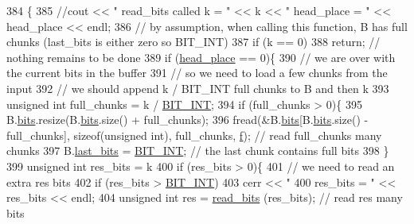 \begin{DoxyCode}
384                                                    \{
385   \textcolor{comment}{//cout << " read\_bits called k = " << k << " head\_place = " << head\_place << endl;}
386   \textcolor{comment}{// by assumption, when calling this function, B has full chunks (last\_bits is either zero so BIT\_INT)}
387   \textcolor{keywordflow}{if} (k == 0)
388     \textcolor{keywordflow}{return}; \textcolor{comment}{// nothing remains to be done}
389   \textcolor{keywordflow}{if} (\hyperlink{classibitstream_a7b96359ac1534a5565e6e9b0cc53a0b3}{head\_place} == 0)\{
390     \textcolor{comment}{// we are over with the current bits in the buffer}
391     \textcolor{comment}{// so we need to load a few chunks from the input}
392     \textcolor{comment}{// we should append k / BIT\_INT full chunks to B and then k %
393     \textcolor{keywordtype}{unsigned} \textcolor{keywordtype}{int} full\_chunks = k / \hyperlink{bitstream_8h_afcadf5aa65c5159bfb96c4d82ebc0a5d}{BIT\_INT};
394     \textcolor{keywordflow}{if} (full\_chunks > 0)\{
395       B.\hyperlink{classbit__pipe_a86f38af1e9736b053728033490476b50}{bits}.resize(B.\hyperlink{classbit__pipe_a86f38af1e9736b053728033490476b50}{bits}.size() + full\_chunks);
396       fread(&B.\hyperlink{classbit__pipe_a86f38af1e9736b053728033490476b50}{bits}[B.\hyperlink{classbit__pipe_a86f38af1e9736b053728033490476b50}{bits}.size() - full\_chunks], \textcolor{keyword}{sizeof}(\textcolor{keywordtype}{unsigned} int), full\_chunks, 
      \hyperlink{classibitstream_a3ea2cdd0cf97820f0e1520c42e364308}{f}); \textcolor{comment}{// read full\_chunks many chunks}
397       B.\hyperlink{classbit__pipe_a0f3e84b02751803adaab499b5dad86fe}{last\_bits} = \hyperlink{bitstream_8h_afcadf5aa65c5159bfb96c4d82ebc0a5d}{BIT\_INT}; \textcolor{comment}{// the last chunk contains full bits }
398     \}
399     \textcolor{keywordtype}{unsigned} \textcolor{keywordtype}{int} res\_bits = k %
400     \textcolor{keywordflow}{if} (res\_bits > 0)\{
401       \textcolor{comment}{// we need to read an extra res bits}
402       \textcolor{keywordflow}{if} (res\_bits > \hyperlink{bitstream_8h_afcadf5aa65c5159bfb96c4d82ebc0a5d}{BIT\_INT})
403         cerr << \textcolor{stringliteral}{" 400 res\_bits = "} << res\_bits << endl;
404       \textcolor{keywordtype}{unsigned} \textcolor{keywordtype}{int} res = \hyperlink{classibitstream_a2fdcaecf10fefa6942dcd5286a2696e0}{read\_bits} (res\_bits); \textcolor{comment}{// read res many bits}
}
\end{DoxyCode}
